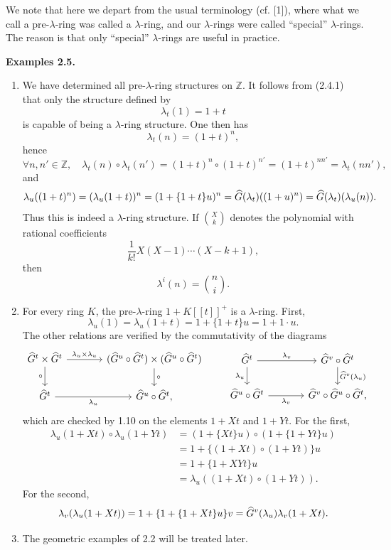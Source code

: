 \documentclass[11pt]{article}
\begin{document}
We note that here we depart from the usual terminology (cf. [1]), where what we call a pre-\(\lambda\)-ring was called a \(\lambda\)-ring, and our \(\lambda\)-rings were called ``special'' \(\lambda\)-rings. The reason is that only ``special'' \(\lambda\)-rings are useful in practice.

\textbf{Examples 2.5.}
\begin{enumerate}[label=\alph*)]
\item We have determined all pre-\(\lambda\)-ring structures on \(\mathbb Z\). It follows from (2.4.1) that only the structure defined by
\[
  \lambda_t(1)=1+t
\]
is capable of being a \(\lambda\)-ring structure. One then has
\[
  \lambda_t(n)=(1+t)^n,
\]
hence
\[
  \forall n,n'\in\mathbb Z,\quad
  \lambda_t(n)\circ\lambda_t(n')=(1+t)^n\circ(1+t)^{n'}
  =(1+t)^{nn'}=\lambda_t(nn'),
\]
and
\[
  \lambda_u((1+t)^n)
  =
  (\lambda_u(1+t))^n
  =
  (1+\{1+t\}u)^n
  =
  \widehat G(\lambda_t)((1+u)^n)
  =
  \widehat G(\lambda_t)(\lambda_u(n)).
\]
Thus this is indeed a \(\lambda\)-ring structure. If \(\binom{X}{k}\) denotes the polynomial with rational coefficients
\[
  \frac{1}{k!}X(X-1)\cdots(X-k+1),
\]
then
\begin{equation}\tag{2.5.1}
  \lambda^i(n)=\binom{n}{i}.
\end{equation}

\item For every ring \(K\), the pre-\(\lambda\)-ring \(1+K[[t]]^+\) is a \(\lambda\)-ring. First,
\[
  \lambda_u(1)=\lambda_u(1+t)=1+\{1+t\}u=1+1\cdot u.
\]
The other relations are verified by the commutativity of the diagrams
\[
\begin{tikzcd}[column sep=large]
\Ghat^t\times\Ghat^t \arrow[r,"\lambda_u\times\lambda_u"] \arrow[d,"\circ"'] &
(\Ghat^u\circ\Ghat^t)\times(\Ghat^u\circ\Ghat^t) \arrow[d,"\circ"]\\
\Ghat^t \arrow[r,"\lambda_u"'] &
\Ghat^u\circ\Ghat^t,
\end{tikzcd}
\qquad
\begin{tikzcd}[column sep=large]
\Ghat^t \arrow[r,"\lambda_v"] \arrow[d,"\lambda_u"'] &
\Ghat^v\circ\Ghat^t \arrow[d,"\Ghat^v(\lambda_u)"]\\
\Ghat^u\circ\Ghat^t \arrow[r,"\lambda_v"'] &
\Ghat^v\circ\Ghat^u\circ\Ghat^t,
\end{tikzcd}
\]
which are checked by 1.10 on the elements \(1+Xt\) and \(1+Yt\). For the first,
\[
\begin{aligned}
\lambda_u(1+Xt)\circ\lambda_u(1+Yt)
&=(1+\{Xt\}u)\circ(1+\{1+Yt\}u)\\
&=1+\{(1+Xt)\circ(1+Yt)\}u\\
&=1+\{1+XYt\}u\\
&=\lambda_u((1+Xt)\circ(1+Yt)).
\end{aligned}
\]
For the second,
\[
  \lambda_v(\lambda_u(1+Xt))
  =
  1+\{1+\{1+Xt\}u\}v
  =
  \widehat G^v(\lambda_u)\lambda_v(1+Xt).
\]

\item The geometric examples of 2.2 will be treated later.
\end{enumerate}
\end{document}
